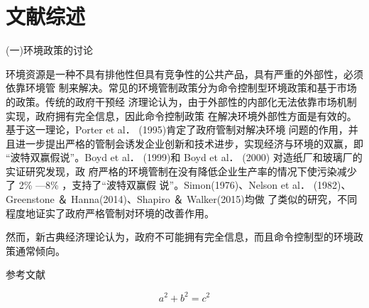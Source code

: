 \documentclass{chinese-erj}
\begin{document}
\section{文献综述}
(一)环境政策的讨论

环境资源是一种不具有排他性但具有竞争性的公共产品，具有严重的外部性，必须依靠环境管
制来解决。常见的环境管制政策分为命令控制型环境政策和基于市场的政策。传统的政府干预经
济理论认为，由于外部性的内部化无法依靠市场机制实现，政府拥有完全信息，因此命令控制政策
在解决环境外部性方面是有效的。基于这一理论，Porter et al． (1995)肯定了政府管制对解决环境
问题的作用，并且进一步提出严格的管制会诱发企业创新和技术进步，实现经济与环境的双赢，即
“波特双赢假说”。Boyd et al． (1999)和 Boyd et al． (2000) 对造纸厂和玻璃厂的实证研究发现，政
府严格的环境管制在没有降低企业生产率的情况下使污染减少了 2\% —8\% ，支持了“波特双赢假
说”。Simon(1976)、Nelson et al． (1982)、Greenstone ＆ Hanna(2014)、Shapiro ＆ Walker(2015)均做
了类似的研究，不同程度地证实了政府严格管制对环境的改善作用。

然而，新古典经济理论认为，政府不可能拥有完全信息，而且命令控制型的环境政策通常倾向。

\vspace*{0.8\baselineskip}
\begin{flushleft}
\small 参考文献
\vspace*{-0.3\baselineskip}
\end{flushleft}
\printbibliography[heading=none]

\begin{equation}
a^2 + b ^2 = c^2
\end{equation}
\end{document}
